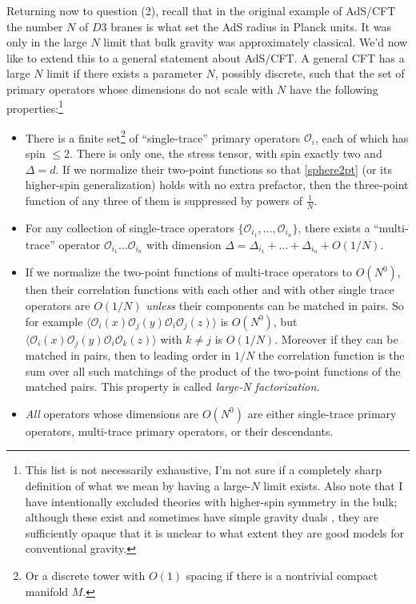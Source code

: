 \documentclass[12pt]{article}
\newcommand{\lan}{\langle}
\newcommand{\ran}{\rangle}
\begin{document}
Returning now to question (2), recall that in the original example of AdS/CFT the number $N$ of $D3$ branes is what set the AdS radius in Planck units.  It was only in the large $N$ limit that bulk gravity was approximately classical.  We'd now like to extend this to a general statement about AdS/CFT.  A general CFT has a large $N$ limit if there exists a parameter $N$, possibly discrete,  such that the set of primary operators whose dimensions do not scale with $N$ have the following properties:\footnote{This list is not necessarily exhaustive, I'm not sure if a completely sharp definition of what we mean by having a large-$N$ limit exists.  Also note that I have intentionally excluded theories with higher-spin symmetry in the bulk; although these exist \cite{Vasiliev:1990en} and sometimes have simple gravity duals  \cite{Klebanov:2002ja,Giombi:2009wh,Gaberdiel:2010pz}, they are sufficiently opaque that it is unclear to what extent they are good models for conventional gravity.}
\begin{itemize}
\item There is a finite set\footnote{Or a discrete tower with $O(1)$ spacing if there is a nontrivial compact manifold $M$.} of ``single-trace'' primary operators $\mathcal{O}_i$, each of which has spin $\leq 2$.  There is only one, the stress tensor, with spin exactly two and $\Delta=d$.  If we normalize their two-point functions so that \eqref{sphere2pt} (or its higher-spin generalization) holds with no extra prefactor, then the three-point function of any three of them is suppressed by powers of $\frac{1}{N}$.  
\item For any collection of single-trace operators $\{\mathcal{O}_{i_1},\ldots ,\mathcal{O}_{i_n}\}$, there exists a ``multi-trace'' operator $\mathcal{O}_{i_1}\ldots\mathcal{O}_{i_n}$ with dimension $\Delta=\Delta_{i_1}+\ldots+\Delta_{i_n}+O(1/N)$.
\item If we normalize the two-point functions of multi-trace operators to $O(N^0)$, then their correlation functions with each other and with other single trace operators are $O(1/N)$ \textit{unless} their components can be matched in pairs.  So for example $\lan\mathcal{O}_i(x)\mathcal{O}_j(y) \mathcal{O}_i\mathcal{O}_j(z)\ran$ is $O(N^0)$, but  $\lan\mathcal{O}_i(x)\mathcal{O}_j(y) \mathcal{O}_i\mathcal{O}_k(z)\ran$ with $k\neq j$ is $O(1/N)$.  Moreover if they can be matched in pairs, then to leading order in $1/N$ the correlation function is the sum over all such matchings of the product of the two-point functions of the matched pairs.  This property is called \textit{large-N factorization}. 
\item \textit{All} operators whose dimensions are $O(N^0)$ are either single-trace primary operators, multi-trace primary operators, or their descendants.
\end{itemize}
\end{document}
